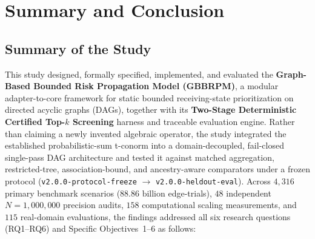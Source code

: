 \section{Summary and Conclusion}\label{summary-and-conclusion}

\subsection{Summary of the Study}

This study designed, formally specified, implemented, and evaluated the
\textbf{Graph-Based Bounded Risk Propagation Model (GBBRPM)}, a
modular adapter-to-core framework for static bounded receiving-state
prioritization on directed acyclic graphs (DAGs), together with its
\textbf{Two-Stage Deterministic Certified Top-$k$ Screening} harness
and traceable evaluation engine. Rather than claiming a newly invented
algebraic operator, the study integrated the established
probabilistic-sum t-conorm \citep{klement2004} into a domain-decoupled,
fail-closed single-pass DAG architecture and tested it against matched
aggregation, restricted-tree, association-bound, and ancestry-aware
comparators under a frozen protocol
(\texttt{v2.0.0-protocol-freeze} $\to$ \texttt{v2.0.0-heldout-eval}).
Across $4,316$ primary benchmark scenarios ($88.86\text{ billion}$
edge-trials), $48$ independent $N=1{,}000{,}000$ precision audits,
$158$ computational scaling measurements, and $115$ real-domain
evaluations, the findings addressed all six research questions (RQ1--RQ6)
and Specific Objectives~1--6 as follows:

